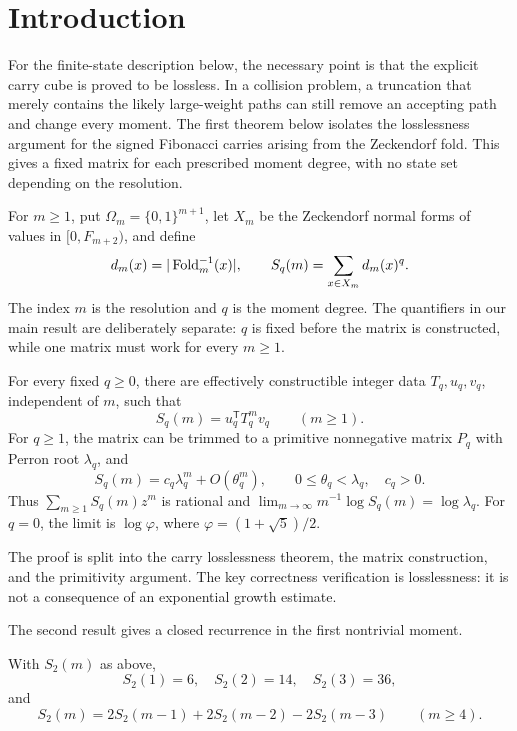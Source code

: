 \section{Introduction}
\label{sec:introduction}

For the finite-state description below, the necessary point is that the
explicit carry cube is proved to be lossless.  In a collision problem, a
truncation that merely contains the likely large-weight paths can still remove
an accepting path and change every moment.  The first theorem below isolates
the losslessness argument for the signed Fibonacci carries arising from the
Zeckendorf fold.  This gives a fixed matrix for each prescribed moment degree,
with no state set depending on the resolution.

For \(m\ge1\), put \(\Omega_m=\{0,1\}^{m+1}\), let \(X_m\) be the Zeckendorf
normal forms of values in \([0,F_{m+2})\), and define
\[
 d_m(x)=|\operatorname{Fold}_m^{-1}(x)|,\qquad
 S_q(m)=\sum_{x\in X_m}d_m(x)^q .
\]
The index \(m\) is the resolution and \(q\) is the moment degree.  The
quantifiers in our main result are deliberately separate: \(q\) is fixed
before the matrix is constructed, while one matrix must work for every
\(m\ge1\).

\begin{theorem}
\label{thm:main-transfer}
For every fixed \(q\ge0\), there are effectively constructible integer data
\(T_q,u_q,v_q\), independent of \(m\), such that
\[
 S_q(m)=u_q^{\mathsf T}T_q^m v_q\qquad(m\ge1).
\]
For \(q\ge1\), the matrix can be trimmed to a primitive nonnegative matrix
\(P_q\) with Perron root \(\lambda_q\), and
\[
 S_q(m)=c_q\lambda_q^m+O(\theta_q^m),
 \qquad 0\le\theta_q<\lambda_q,\quad c_q>0 .
\]
Thus \(\sum_{m\ge1}S_q(m)z^m\) is rational and
\(\lim_{m\to\infty}m^{-1}\log S_q(m)=\log\lambda_q\).
For \(q=0\), the limit is \(\log\varphi\), where
\(\varphi=(1+\sqrt5)/2\).
\end{theorem}

The proof is split into the carry losslessness theorem, the matrix
construction, and the primitivity argument.  The key correctness verification
is losslessness: it is not a consequence of an exponential growth estimate.

The second result gives a closed recurrence in the first nontrivial moment.
\begin{theorem}
\label{thm:intro-second-moment}
With \(S_2(m)\) as above,
\[
 S_2(1)=6,\quad S_2(2)=14,\quad S_2(3)=36,
\]
and
\[
 S_2(m)=2S_2(m-1)+2S_2(m-2)-2S_2(m-3)\qquad(m\ge4).
\]
\end{theorem}

